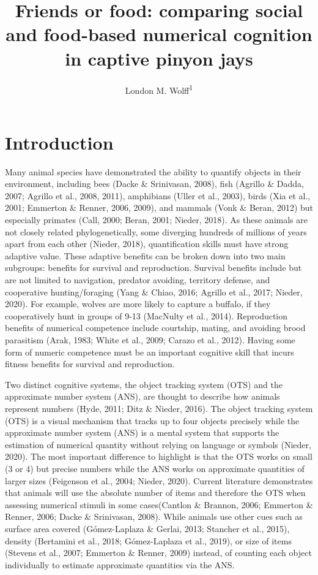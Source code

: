 \documentclass[
  ,doc,floatsintext]{apa6}
\title{Friends or food: comparing social and food-based numerical cognition in captive pinyon jays}
\author{London M. Wolff\textsuperscript{1}}
\date{}
\affiliation{\vspace{0.5cm}\textsuperscript{1} Department of Psychology, Center for Brain, Biology \& Behavior, University of Nebraska, Lincoln, Lincoln, NE, USA}
\begin{document}
\maketitle

\hypertarget{introduction}{%
\section{Introduction}\label{introduction}}

Many animal species have demonstrated the ability to quantify objects in their environment, including bees (Dacke \& Srinivasan, 2008), fish (Agrillo \& Dadda, 2007; Agrillo et al., 2008, 2011), amphibians (Uller et al., 2003), birds (Xia et al., 2001; Emmerton \& Renner, 2006, 2009), and mammals (Vonk \& Beran, 2012) but especially primates (Call, 2000; Beran, 2001; Nieder, 2018). As these animals are not closely related phylogenetically, some diverging hundreds of millions of years apart from each other (Nieder, 2018), quantification skills must have strong adaptive value. These adaptive benefits can be broken down into two main subgroups: benefits for survival and reproduction. Survival benefits include but are not limited to navigation, predator avoiding, territory defense, and cooperative hunting/foraging (Yang \& Chiao, 2016; Agrillo et al., 2017; Nieder, 2020). For example, wolves are more likely to capture a buffalo, if they cooperatively hunt in groups of 9-13 (MacNulty et al., 2014). Reproduction benefits of numerical competence include courtship, mating, and avoiding brood parasitism (Arak, 1983; White et al., 2009; Carazo et al., 2012). Having some form of numeric competence must be an important cognitive skill that incurs fitness benefits for survival and reproduction.

Two distinct cognitive systems, the object tracking system (OTS) and the approximate number system (ANS), are thought to describe how animals represent numbers (Hyde, 2011; Ditz \& Nieder, 2016). The object tracking system (OTS) is a visual mechanism that tracks up to four objects precisely while the approximate number system (ANS) is a mental system that supports the estimation of numerical quantity without relying on language or symbols (Nieder, 2020). The most important difference to highlight is that the OTS works on small (3 or 4) but precise numbers while the ANS works on approximate quantities of larger sizes (Feigenson et al., 2004; Nieder, 2020). Current literature demonstrates that animals will use the absolute number of items and therefore the OTS when assessing numerical stimuli in some cases(Cantlon \& Brannon, 2006; Emmerton \& Renner, 2006; Dacke \& Srinivasan, 2008). While animals use other cues such as surface area covered (Gómez-Laplaza \& Gerlai, 2013; Stancher et al., 2015), density (Bertamini et al., 2018; Gómez-Laplaza et al., 2019), or size of items (Stevens et al., 2007; Emmerton \& Renner, 2009) instead, of counting each object individually to estimate approximate quantities via the ANS.
\end{document}
